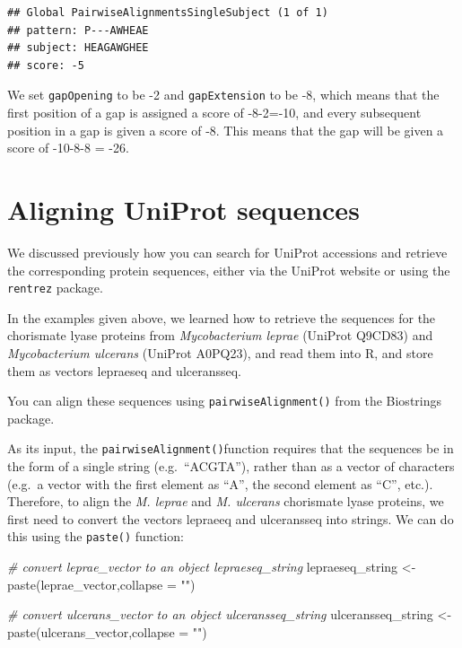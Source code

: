 \documentclass[
]{book}
\newenvironment{Shaded}{\begin{snugshade}}{\end{snugshade}}
\newcommand{\AttributeTok}[1]{\textcolor[rgb]{0.77,0.63,0.00}{#1}}
\newcommand{\CommentTok}[1]{\textcolor[rgb]{0.56,0.35,0.01}{\textit{#1}}}
\newcommand{\FunctionTok}[1]{\textcolor[rgb]{0.00,0.00,0.00}{#1}}
\newcommand{\NormalTok}[1]{#1}
\newcommand{\OtherTok}[1]{\textcolor[rgb]{0.56,0.35,0.01}{#1}}
\newcommand{\StringTok}[1]{\textcolor[rgb]{0.31,0.60,0.02}{#1}}
\begin{document}
\begin{verbatim}
## Global PairwiseAlignmentsSingleSubject (1 of 1)
## pattern: P---AWHEAE
## subject: HEAGAWGHEE
## score: -5
\end{verbatim}

We set \texttt{gapOpening} to be -2 and \texttt{gapExtension} to be -8, which means that the first position of a gap is assigned a score of -8-2=-10, and every subsequent position in a gap is given a score of -8. This means that the gap will be given a score of -10-8-8 = -26.

\hypertarget{aligning-uniprot-sequences}{%
\section{Aligning UniProt sequences}\label{aligning-uniprot-sequences}}

We discussed previously how you can search for UniProt accessions and retrieve the corresponding protein sequences, either via the UniProt website or using the \texttt{rentrez} package.

In the examples given above, we learned how to retrieve the sequences for the chorismate lyase proteins from \emph{Mycobacterium leprae} (UniProt Q9CD83) and \emph{Mycobacterium ulcerans} (UniProt A0PQ23), and read them into R, and store them as vectors lepraeseq and ulceransseq.

You can align these sequences using \texttt{pairwiseAlignment()} from the Biostrings package.

As its input, the \texttt{pairwiseAlignment()}function requires that the sequences be in the form of a single string (e.g.~``ACGTA''), rather than as a vector of characters (e.g.~a vector with the first element as ``A'', the second element as ``C'', etc.). Therefore, to align the \emph{M. leprae} and \emph{M. ulcerans} chorismate lyase proteins, we first need to convert the vectors lepraeeq and ulceransseq into strings. We can do this using the \texttt{paste()} function:

\begin{Shaded}
\begin{Highlighting}[]
\CommentTok{\# convert leprae\_vector to an object lepraeseq\_string}
\NormalTok{lepraeseq\_string }\OtherTok{\textless{}{-}}\FunctionTok{paste}\NormalTok{(leprae\_vector,}\AttributeTok{collapse =} \StringTok{""}\NormalTok{)    }

\CommentTok{\# convert ulcerans\_vector to an object ulceransseq\_string}
\NormalTok{ulceransseq\_string }\OtherTok{\textless{}{-}}\FunctionTok{paste}\NormalTok{(ulcerans\_vector,}\AttributeTok{collapse =} \StringTok{""}\NormalTok{) }
\end{Highlighting}
\end{Shaded}
\end{document}
